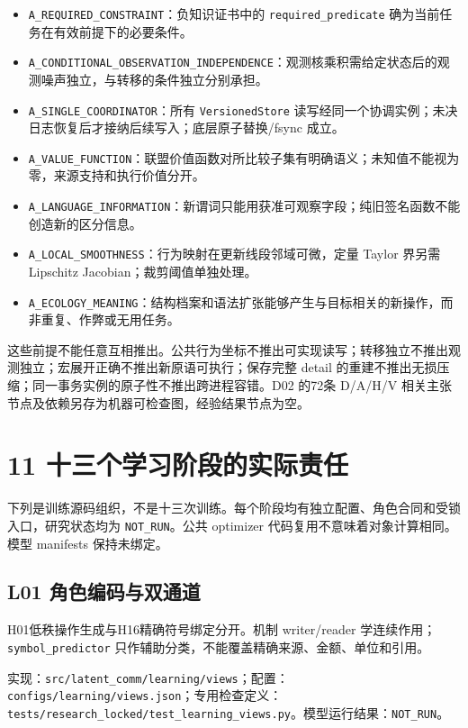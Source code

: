 \documentclass[
  10pt,
]{article}
\begin{document}
\begin{itemize}
\item
  \nolinkurl{A_REQUIRED_CONSTRAINT}：负知识证书中的
  \nolinkurl{required_predicate} 确为当前任务在有效前提下的必要条件。
\item
  \nolinkurl{A_CONDITIONAL_OBSERVATION_INDEPENDENCE}：观测核乘积需给定状态后的观测噪声独立，与转移的条件独立分别承担。
\item
  \nolinkurl{A_SINGLE_COORDINATOR}：所有 \nolinkurl{VersionedStore}
  读写经同一个协调实例；未决日志恢复后才接纳后续写入；底层原子替换/fsync
  成立。
\item
  \nolinkurl{A_VALUE_FUNCTION}：联盟价值函数对所比较子集有明确语义；未知值不能视为零，来源支持和执行价值分开。
\item
  \nolinkurl{A_LANGUAGE_INFORMATION}：新谓词只能用获准可观察字段；纯旧签名函数不能创造新的区分信息。
\item
  \nolinkurl{A_LOCAL_SMOOTHNESS}：行为映射在更新线段邻域可微，定量
  Taylor 界另需 Lipschitz Jacobian；裁剪阈值单独处理。
\item
  \nolinkurl{A_ECOLOGY_MEANING}：结构档案和语法扩张能够产生与目标相关的新操作，而非重复、作弊或无用任务。
\end{itemize}

这些前提不能任意互相推出。公共行为坐标不推出可实现读写；转移独立不推出观测独立；宏展开正确不推出新原语可执行；保存完整
detail 的重建不推出无损压缩；同一事务实例的原子性不推出跨进程容错。D02
的72条 D/A/H/V 相关主张节点及依赖另存为机器可检查图，经验结果节点为空。

\section{11
十三个学习阶段的实际责任}\label{ux5341ux4e09ux4e2aux5b66ux4e60ux9636ux6bb5ux7684ux5b9eux9645ux8d23ux4efb}

下列是训练源码组织，不是十三次训练。每个阶段均有独立配置、角色合同和受锁入口，研究状态均为
\nolinkurl{NOT_RUN}。公共 optimizer 代码复用不意味着对象计算相同。模型
manifests 保持未绑定。

\subsection{L01
角色编码与双通道}\label{l01-ux89d2ux8272ux7f16ux7801ux4e0eux53ccux901aux9053}

H01低秩操作生成与H16精确符号绑定分开。机制 writer/reader
学连续作用；\nolinkurl{symbol_predictor}
只作辅助分类，不能覆盖精确来源、金额、单位和引用。

实现：{\small\nolinkurl{src/latent_comm/learning/views}}；配置：{\small\nolinkurl{configs/learning/views.json}}；专用检查定义：{\small\nolinkurl{tests/research_locked/test_learning_views.py}}。模型运行结果：\nolinkurl{NOT_RUN}。
\end{document}
